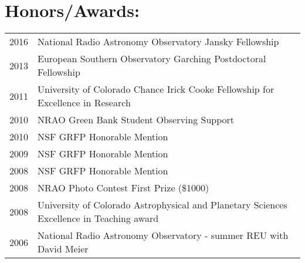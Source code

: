 \setlength{\extrarowheight}{0pt}
\section*{Honors/Awards: }
\begin{tabular}{ll}
     2016 & National Radio Astronomy Observatory Jansky Fellowship \\
     2013 & European Southern Observatory Garching Postdoctoral Fellowship \\
     2011 & University of Colorado Chance Irick Cooke Fellowship for Excellence in Research \\
     2010 & NRAO Green Bank Student Observing Support  \\
     2010 & NSF GRFP Honorable Mention  \\
     2009 & NSF GRFP Honorable Mention  \\
     2008 & NSF GRFP Honorable Mention  \\
     2008 & NRAO Photo Contest First Prize (\$1000)\\
     2008 & University of Colorado Astrophysical and Planetary Sciences Excellence in Teaching award  \\
     2006 & National Radio Astronomy Observatory - summer REU with David Meier  \\
\end{tabular}

